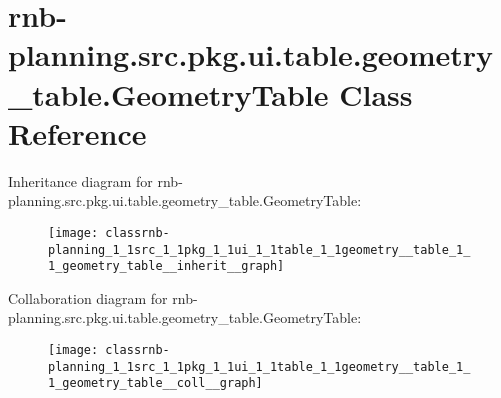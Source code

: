 \hypertarget{classrnb-planning_1_1src_1_1pkg_1_1ui_1_1table_1_1geometry__table_1_1_geometry_table}{}\section{rnb-\/planning.src.\+pkg.\+ui.\+table.\+geometry\+\_\+table.\+Geometry\+Table Class Reference}
\label{classrnb-planning_1_1src_1_1pkg_1_1ui_1_1table_1_1geometry__table_1_1_geometry_table}


Inheritance diagram for rnb-\/planning.src.\+pkg.\+ui.\+table.\+geometry\+\_\+table.\+Geometry\+Table\+:\nopagebreak
\begin{figure}[H]
\begin{center}
\leavevmode
\texttt{[image: classrnb-planning\_1\_1src\_1\_1pkg\_1\_1ui\_1\_1table\_1\_1geometry\_\_table\_1\_1\_geometry\_table\_\_inherit\_\_graph]}
\end{center}
\end{figure}


Collaboration diagram for rnb-\/planning.src.\+pkg.\+ui.\+table.\+geometry\+\_\+table.\+Geometry\+Table\+:\nopagebreak
\begin{figure}[H]
\begin{center}
\leavevmode
\texttt{[image: classrnb-planning\_1\_1src\_1\_1pkg\_1\_1ui\_1\_1table\_1\_1geometry\_\_table\_1\_1\_geometry\_table\_\_coll\_\_graph]}
\end{center}
\end{figure}
